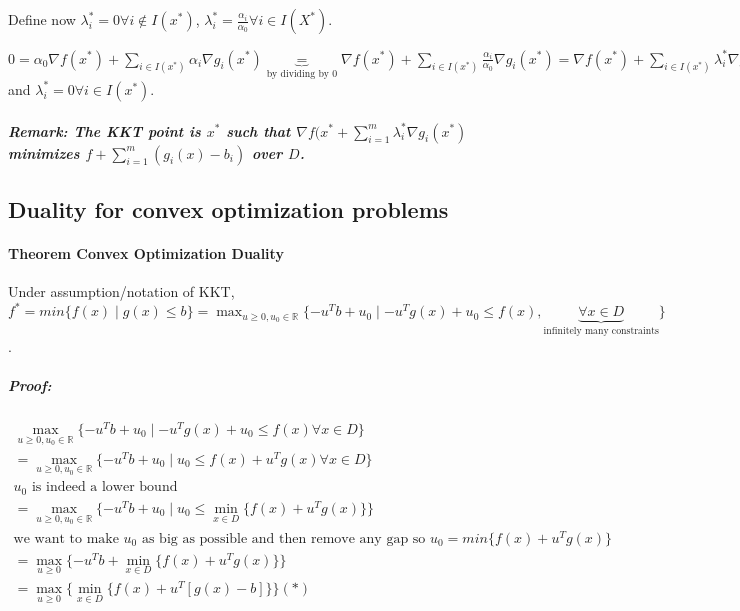 \documentclass[main]{subfiles}
\begin{document}
Define now $\lambda_{i}^{*} = 0 \forall i \notin I(x^{*})$, $\lambda_{i}^{*} =
\frac{\alpha_{i}}{\alpha_{0}} \forall i \in I(X^{*})$.

$0 = \alpha_{0} \nabla f(x^{*}) + \sum_{i \in I(x^{*})} \alpha_{i} \nabla
g_{i}(x^{*}) \underbrace{=}_{\text{by dividing by $0$}} \nabla f(x^{*}) +
\sum_{i \in I(x^{*})} \frac{\alpha_{i}}{\alpha_{0}}\nabla g_{i}(x^{*}) =
\nabla f(x^{*}) + \sum_{i \in I(x^{*})} \lambda_{i}^{*} \nabla g_{i}(x^{*})$
and $ \lambda_{i}^{*} = 0 \forall i \in I(x^{*})$.

\subparagraph{Remark: The KKT point is $x^{*}$ such that $\nabla f(x^{*} +
\sum_{i=1}^{m} \lambda_{i}^{*} \nabla g_{i}(x^{*})$ minimizes
$f + \sum_{i =1 }^{m} (g_{i}(x) - b_{i})$ over $D$.}

\subsection{Duality for convex optimization problems}

\paragraph{Theorem Convex Optimization Duality}
Under assumption/notation of KKT, $f^{*} = min \{ f(x) \mid g(x) \leq b \} =
\displaystyle \max_{u \geq 0, u_{0} \in \mathbb{R}} \{-u^{T}b + u_{0}
\mid -u^{T}g(x) + u_{0} \leq f(x), \underbrace{\forall x \in D}
_{\text{infinitely many constraints}} \}$.

\subparagraph{Proof:}

\begin{gather*}
\max_{u \geq 0, u_{0} \in \mathbb{R}} \{-u^{T}b + u_{0} \mid -u^{T}g(x) + u_{0}
\leq f(x) \forall x \in D \} \\
= \max_{u \geq 0, u_{0} \in \mathbb{R}} \{-u^{T}b + u_{0} \mid u_{0} \leq f(x)
+ u^{T}g(x) \forall x \in D \} \\
\text{$u_{0}$ is indeed a lower bound} \\
= \max_{u \geq 0, u_{0} \in \mathbb{R}} \{-u^{T}b + u_{0} \mid u_{0} \leq 
\min_{x \in D} \{f(x) + u^{T}g(x)\} \} \\
\text{we want to make $u_{0}$ as big as possible and then remove any gap so 
$u_{0} = min \{f(x) + u^{T}g(x)\}$ } \\
= \max_{u \geq 0} \{-u^{T}b + \min_{x \in D} \{f(x) + u^{T}g(x)\} \} \\
= \max_{u \geq 0} \{ \min_{x \in D} \{f(x) + u^{T}[g(x) -b] \} \} (*)\\
\end{gather*}
\end{document}
